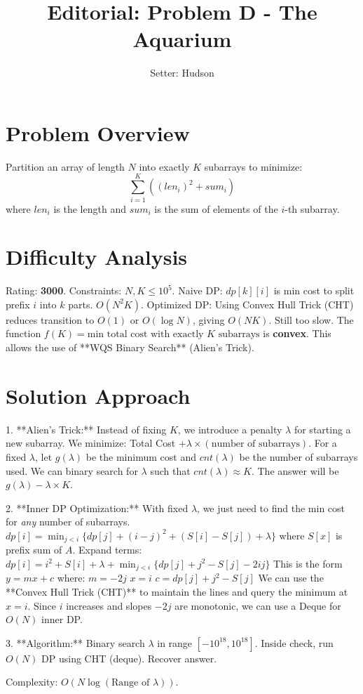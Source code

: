 \documentclass[11pt]{article}
\title{\textbf{Editorial: Problem D - The Aquarium}}
\author{Setter: Hudson}
\date{}
\begin{document}
\maketitle

\section*{Problem Overview}
Partition an array of length $N$ into exactly $K$ subarrays to minimize:
$$ \sum_{i=1}^K ((len_i)^2 + sum_i) $$
where $len_i$ is the length and $sum_i$ is the sum of elements of the $i$-th subarray.

\section*{Difficulty Analysis}
Rating: \textbf{3000}.
Constraints: $N, K \le 10^5$.
Naive DP: $dp[k][i]$ is min cost to split prefix $i$ into $k$ parts. $O(N^2 K)$.
Optimized DP: Using Convex Hull Trick (CHT) reduces transition to $O(1)$ or $O(\log N)$, giving $O(NK)$. Still too slow.
The function $f(K) = \text{min total cost with exactly } K \text{ subarrays}$ is \textbf{convex}.
This allows the use of **WQS Binary Search** (Alien's Trick).

\section*{Solution Approach}
1. **Alien's Trick:**
   Instead of fixing $K$, we introduce a penalty $\lambda$ for starting a new subarray.
   We minimize: Total Cost $+ \lambda \times (\text{number of subarrays})$.
   For a fixed $\lambda$, let $g(\lambda)$ be the minimum cost and $cnt(\lambda)$ be the number of subarrays used.
   We can binary search for $\lambda$ such that $cnt(\lambda) \approx K$.
   The answer will be $g(\lambda) - \lambda \times K$.

2. **Inner DP Optimization:**
   With fixed $\lambda$, we just need to find the min cost for \textit{any} number of subarrays.
   $dp[i] = \min_{j < i} \{ dp[j] + (i - j)^2 + (S[i] - S[j]) + \lambda \}$
   where $S[x]$ is prefix sum of $A$.
   Expand terms:
   $dp[i] = i^2 + S[i] + \lambda + \min_{j < i} \{ dp[j] + j^2 - S[j] - 2ij \}$
   This is the form $y = mx + c$ where:
   $m = -2j$
   $x = i$
   $c = dp[j] + j^2 - S[j]$
   We can use the **Convex Hull Trick (CHT)** to maintain the lines and query the minimum at $x = i$. Since $i$ increases and slopes $-2j$ are monotonic, we can use a Deque for $O(N)$ inner DP.

3. **Algorithm:**
   Binary search $\lambda$ in range $[-10^{18}, 10^{18}]$.
   Inside check, run $O(N)$ DP using CHT (deque).
   Recover answer.

Complexity: $O(N \log (\text{Range of } \lambda))$.
\end{document}

